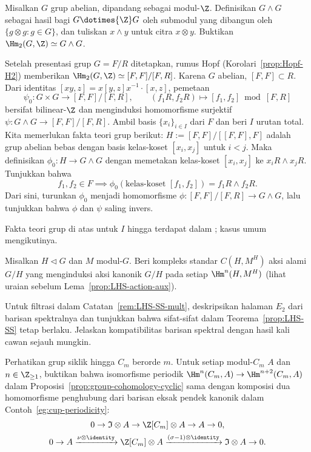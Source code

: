 \begin{Exercises}
	\item Misalkan $G$ grup abelian, dipandang sebagai modul-$\Z$. Definisikan
	$G\wedge G$ sebagai hasil bagi $G\dotimes{\Z}G$ oleh submodul yang dibangun
	oleh $\{g\otimes g:g\in G\}$, dan tuliskan $x\wedge y$ untuk citra
	$x\otimes y$. Buktikan $\Hm_2(G,\Z)\simeq G\wedge G$.

	\begin{hint}
		\index[sym1]{[,]}
		Setelah presentasi grup $G=F/R$ ditetapkan, rumus Hopf
		(Korolari~\ref{prop:Hopf-H2}) memberikan
		$\Hm_2(G,\Z)\simeq[F,F]/[F,R]$. Karena $G$ abelian,
		$[F,F]\subset R$. Dari identitas
		$[xy,z]=x[y,z]x^{-1}\cdot[x,z]$, pemetaan
		\[ \psi_0:G\times G\to[F,F]/[F,R],\qquad
		(f_1R,f_2R)\mapsto[f_1,f_2]\bmod[F,R] \]
		bersifat bilinear-$\Z$ dan menginduksi homomorfisme surjektif
		$\psi:G\wedge G\to[F,F]/[F,R]$. Ambil basis $\{x_i\}_{i\in I}$ dari
		$F$ dan beri $I$ urutan total. Kita memerlukan fakta teori grup berikut:
		$H:=[F,F]/[[F,F],F]$ adalah grup abelian bebas dengan basis kelas-koset
		$[x_i,x_j]$ untuk $i<j$. Maka definisikan
		$\phi_0:H\to G\wedge G$ dengan memetakan kelas-koset $[x_i,x_j]$ ke
		$x_iR\wedge x_jR$. Tunjukkan bahwa
		\[ f_1,f_2\in F\implies
		\phi_0(\text{kelas-koset }[f_1,f_2])=f_1R\wedge f_2R. \]
		Dari sini, turunkan $\phi_0$ menjadi homomorfisme
		$\phi:[F,F]/[F,R]\to G\wedge G$, lalu tunjukkan bahwa $\phi$ dan
		$\psi$ saling invers.

		Fakta teori grup di atas untuk $I$ hingga terdapat dalam
		\cite[Teorema 11.2.4]{Ha76}; kasus umum mengikutinya.
	\end{hint}

	\item Misalkan $H\lhd G$ dan $M$ modul-$G$. Beri kompleks standar
	$C(H,M^H)$ aksi alami $G/H$ yang menginduksi aksi kanonik $G/H$ pada setiap
	$\Hm^n(H,M^H)$ (lihat uraian sebelum Lema~\ref{prop:LHS-action-aux}).

	\item Untuk filtrasi dalam Catatan~\ref{rem:LHS-SS-mult}, deskripsikan
	halaman $E_2$ dari barisan spektralnya dan tunjukkan bahwa sifat-sifat dalam
	Teorema~\ref{prop:LHS-SS} tetap berlaku. Jelaskan kompatibilitas barisan
	spektral dengan hasil kali cawan sejauh mungkin.

	\item Perhatikan grup siklik hingga $C_m$ berorde $m$. Untuk setiap
	modul-$C_m$ $A$ dan $n\in\Z_{\geq1}$, buktikan bahwa isomorfisme periodik
	$\Hm^n(C_m,A)\to\Hm^{n+2}(C_m,A)$ dalam
	Proposisi~\ref{prop:group-cohomology-cyclic} sama dengan komposisi dua
	homomorfisme penghubung dari barisan eksak pendek kanonik dalam
	Contoh~\ref{eg:cup-periodicity}:
	\begin{gather*}
		0\to\mathfrak{I}\otimes A\to\Z[C_m]\otimes A\to A\to0,\\
		0\to A\xrightarrow{\nu\otimes\identity}\Z[C_m]\otimes A
		\xrightarrow{(\sigma-1)\otimes\identity}\mathfrak{I}\otimes A\to0.
	\end{gather*}


\end{Exercises}
